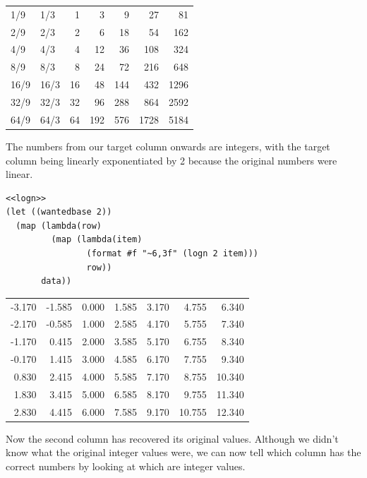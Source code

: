 \documentclass[final,fleqn,titlepage,twoside]{article}
\begin{document}
\begin{center}
\begin{tabular}{llrrrrr}
1/9 & 1/3 & 1 & 3 & 9 & 27 & 81\\[0pt]
2/9 & 2/3 & 2 & 6 & 18 & 54 & 162\\[0pt]
4/9 & 4/3 & 4 & 12 & 36 & 108 & 324\\[0pt]
8/9 & 8/3 & 8 & 24 & 72 & 216 & 648\\[0pt]
16/9 & 16/3 & 16 & 48 & 144 & 432 & 1296\\[0pt]
32/9 & 32/3 & 32 & 96 & 288 & 864 & 2592\\[0pt]
64/9 & 64/3 & 64 & 192 & 576 & 1728 & 5184\\[0pt]
\end{tabular}
\end{center}

The numbers from our target column onwards are integers, with the target column
being linearly exponentiated by 2 because the original numbers were linear.

\begin{verbatim}
<<logn>>
(let ((wantedbase 2))
  (map (lambda(row)
         (map (lambda(item)
                (format #f "~6,3f" (logn 2 item)))
                row))
       data))
\end{verbatim}

\begin{center}
\begin{tabular}{rrrrrrr}
-3.170 & -1.585 & 0.000 & 1.585 & 3.170 & 4.755 & 6.340\\[0pt]
-2.170 & -0.585 & 1.000 & 2.585 & 4.170 & 5.755 & 7.340\\[0pt]
-1.170 & 0.415 & 2.000 & 3.585 & 5.170 & 6.755 & 8.340\\[0pt]
-0.170 & 1.415 & 3.000 & 4.585 & 6.170 & 7.755 & 9.340\\[0pt]
0.830 & 2.415 & 4.000 & 5.585 & 7.170 & 8.755 & 10.340\\[0pt]
1.830 & 3.415 & 5.000 & 6.585 & 8.170 & 9.755 & 11.340\\[0pt]
2.830 & 4.415 & 6.000 & 7.585 & 9.170 & 10.755 & 12.340\\[0pt]
\end{tabular}
\end{center}

Now the second column has recovered its original values. Although we didn't know
what the original integer values were, we can now tell which column has the
correct numbers by looking at which are integer values.
\end{document}
